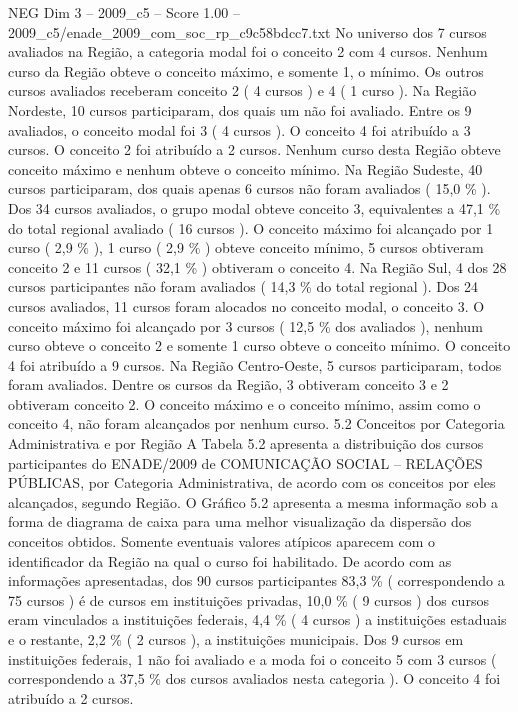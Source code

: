 \begin{textsample}{NEG Dim 3 – 2009\_c5 – Score 1.00 – 2009\_c5/enade\_2009\_com\_soc\_rp\_c9c58bdcc7.txt}
No universo dos 7 cursos avaliados na Região, a categoria modal foi o conceito 2 com 4 cursos.
Nenhum curso da Região obteve o conceito máximo, e somente 1, o mínimo.
Os outros cursos avaliados receberam conceito 2 ( 4 cursos ) e 4 ( 1 curso ).
Na Região Nordeste, 10 cursos participaram, dos quais um não foi avaliado.
Entre os 9 avaliados, o conceito modal foi 3 ( 4 cursos ).
O conceito 4 foi atribuído a 3 cursos.
O conceito 2 foi atribuído a 2 cursos.
Nenhum curso desta Região obteve conceito máximo e nenhum obteve o conceito mínimo.
Na Região Sudeste, 40 cursos participaram, dos quais apenas 6 cursos não foram avaliados ( 15,0 \% ).
Dos 34 cursos avaliados, o grupo modal obteve conceito 3, equivalentes a 47,1 \% do total regional avaliado ( 16 cursos ).
O conceito máximo foi alcançado por 1 curso ( 2,9 \% ), 1 curso ( 2,9 \% ) obteve conceito mínimo, 5 cursos obtiveram conceito 2 e 11 cursos ( 32,1 \% ) obtiveram o conceito 4.
Na Região Sul, 4 dos 28 cursos participantes não foram avaliados ( 14,3 \% do total regional ).
Dos 24 cursos avaliados, 11 cursos foram alocados no conceito modal, o conceito 3.
O conceito máximo foi alcançado por 3 cursos ( 12,5 \% dos avaliados ), nenhum curso obteve o conceito 2 e somente 1 curso obteve o conceito mínimo.
O conceito 4 foi atribuído a 9 cursos.
Na Região Centro-Oeste, 5 cursos participaram, todos foram avaliados.
Dentre os cursos da Região, 3 obtiveram conceito 3 e 2 obtiveram conceito 2.
O conceito máximo e o conceito mínimo, assim como o conceito 4, não foram alcançados por nenhum curso. 5.2 Conceitos por Categoria Administrativa e por Região A Tabela 5.2 apresenta a distribuição dos cursos participantes do ENADE/2009 de COMUNICAÇÃO SOCIAL – RELAÇÕES PÚBLICAS, por Categoria Administrativa, de acordo com os conceitos por eles alcançados, segundo Região.
O Gráfico 5.2 apresenta a mesma informação sob a forma de diagrama de caixa para uma melhor visualização da dispersão dos conceitos obtidos.
Somente eventuais valores atípicos aparecem com o identificador da Região na qual o curso foi habilitado.
De acordo com as informações apresentadas, dos 90 cursos participantes 83,3 \% ( correspondendo a 75 cursos ) é de cursos em instituições privadas, 10,0 \% ( 9 cursos ) dos cursos eram vinculados a instituições federais, 4,4 \% ( 4 cursos ) a instituições estaduais e o restante, 2,2 \% ( 2 cursos ), a instituições municipais.
Dos 9 cursos em instituições federais, 1 não foi avaliado e a moda foi o conceito 5 com 3 cursos ( correspondendo a 37,5 \% dos cursos avaliados nesta categoria ).
O conceito 4 foi atribuído a 2 cursos.

\end{textsample}
